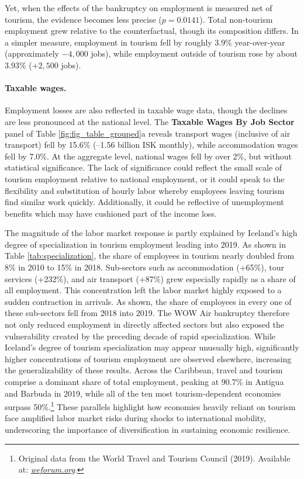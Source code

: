 \documentclass[12pt]{article}
\begin{document}
Yet, when the effects of the bankruptcy on employment is measured net of tourism, the evidence becomes less precise ($p = 0.0141$). Total non-tourism employment grew relative to the counterfactual, though its composition differs. In a simpler measure, employment in tourism fell by roughly $3.9\%$ year-over-year (approximately $-4,000$ jobs), while employment outside of tourism rose by about $3.93\%$ ($+2,500$ jobs).


\paragraph{Taxable wages.}
Employment losses are also reflected in taxable wage data, though the declines are less pronounced at the national level.  The \textbf{Taxable Wages By Job Sector} panel of Table \ref{fig:fig_table_grouped}a  reveals transport wages (inclusive of air transport) fell by 15.6\% (–1.56 billion ISK monthly), while accommodation wages fell by 7.0\%. At the aggregate level, national wages fell by over 2\%, but without statistical significance. The lack of significance could reflect the small scale of tourism employment relative to national employment, or it could speak to the flexibility and substitution of hourly labor whereby employees leaving tourism find similar work quickly. Additionally, it could be reflective of unemployment benefits which may have cushioned part of the income loss.  

The magnitude of the labor market response is partly explained by Iceland’s high degree of specialization in tourism employment leading into 2019. As shown in Table \ref{tab:specialization}, the share of employees in tourism nearly doubled from 8\% in 2010 to 15\% in 2018. Sub-sectors such as accommodation (+65\%), tour services (+232\%), and air transport (+87\%) grew especially rapidly as a share of all employment. This concentration left the labor market highly exposed to a sudden contraction in arrivals. As shown, the share of employees in every one of these sub-sectors fell from 2018 into 2019. The WOW Air bankruptcy therefore not only reduced employment in directly affected sectors but also exposed the vulnerability created by the preceding decade of rapid specialization. While Iceland’s degree of tourism specialization may appear unusually high, significantly higher concentrations of tourism employment are observed elsewhere, increasing the generalizability of these results. Across the Caribbean, travel and tourism comprise a dominant share of total employment, peaking at 90.7\% in Antigua and Barbuda in 2019, while all of the ten most tourism-dependent economies surpass 50\%.\footnote{Original data from the World Travel and Tourism Council (2019). Available at: \href{https://www.weforum.org/stories/2020/08/destinations-rely-most-on-tourism-travel/}{\textit{weforum.org}}.} These parallels highlight how economies heavily reliant on tourism face amplified labor market risks during shocks to international mobility, underscoring the importance of diversification in sustaining economic resilience.
\end{document}
